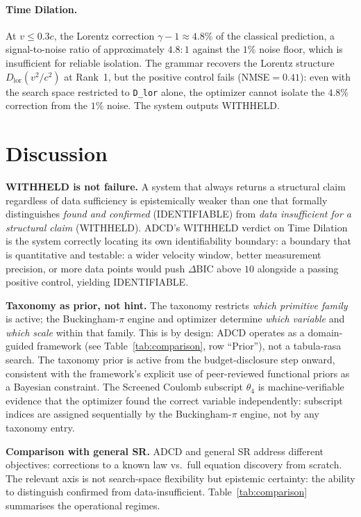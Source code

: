 \documentclass{article}
\begin{document}
\paragraph{Time Dilation.}
At $v\le0.3c$, the Lorentz correction $\gamma-1\approx4.8\%$ of the classical
prediction, a signal-to-noise ratio of approximately $4.8\!:\!1$ against the
$1\%$ noise floor, which is insufficient for reliable isolation.
The grammar recovers the Lorentz structure $D_\mathrm{lor}(v^2/c^2)$ at
Rank~1, but the positive control fails (NMSE$=0.41$): even with the
search space restricted to \texttt{D\_lor} alone, the optimizer cannot
isolate the $4.8\%$ correction from the $1\%$ noise.
The system outputs WITHHELD.

\section{Discussion}

\textbf{WITHHELD is not failure.}
A system that always returns a structural claim regardless of data sufficiency
is epistemically weaker than one that formally distinguishes
\emph{found and confirmed} (IDENTIFIABLE) from
\emph{data insufficient for a structural claim} (WITHHELD).
ADCD's WITHHELD verdict on Time Dilation is the system correctly locating
its own identifiability boundary: a boundary that is quantitative and
testable: a wider velocity window, better measurement precision, or more data
points would push $\Delta\mathrm{BIC}$ above $10$ alongside a passing positive
control, yielding IDENTIFIABLE.

\textbf{Taxonomy as prior, not hint.}
The taxonomy restricts \emph{which primitive family} is active;
the Buckingham-$\pi$ engine and optimizer determine \emph{which variable}
and \emph{which scale} within that family.
This is by design: ADCD operates as a domain-guided framework
(see Table~\ref{tab:comparison}, row ``Prior''), not a tabula-rasa search.
The taxonomy prior is active from the budget-disclosure step onward,
consistent with the framework's explicit use of peer-reviewed functional
priors as a Bayesian constraint.
The Screened Coulomb subscript $\theta_4$ is machine-verifiable evidence
that the optimizer found the correct variable independently: subscript
indices are assigned sequentially by the Buckingham-$\pi$ engine, not
by any taxonomy entry.

\textbf{Comparison with general SR.}
ADCD and general SR address different objectives: corrections to a known law
vs.\ full equation discovery from scratch.
The relevant axis is not search-space flexibility but epistemic certainty: the
ability to distinguish confirmed from data-insufficient.
Table~\ref{tab:comparison} summarises the operational regimes.
\end{document}
